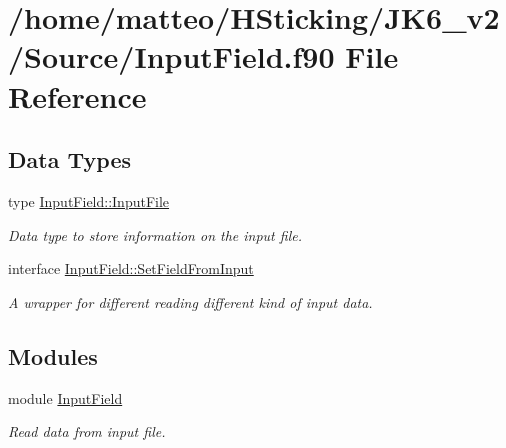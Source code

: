 \hypertarget{_input_field_8f90}{
\section{/home/matteo/HSticking/JK6\_\-v2/Source/InputField.f90 File Reference}
\label{_input_field_8f90}
}
\subsection*{Data Types}
\begin{DoxyCompactItemize}
\item 
type \hyperlink{type_input_field_1_1_input_file}{InputField::InputFile}
\begin{DoxyCompactList}\small\item\em Data type to store information on the input file. \item\end{DoxyCompactList}\item 
interface \hyperlink{interface_input_field_1_1_set_field_from_input}{InputField::SetFieldFromInput}
\begin{DoxyCompactList}\small\item\em A wrapper for different reading different kind of input data. \item\end{DoxyCompactList}\end{DoxyCompactItemize}
\subsection*{Modules}
\begin{DoxyCompactItemize}
\item 
module \hyperlink{namespace_input_field}{InputField}


\begin{DoxyCompactList}\small\item\em Read data from input file. \item\end{DoxyCompactList}\end{DoxyCompactItemize}
